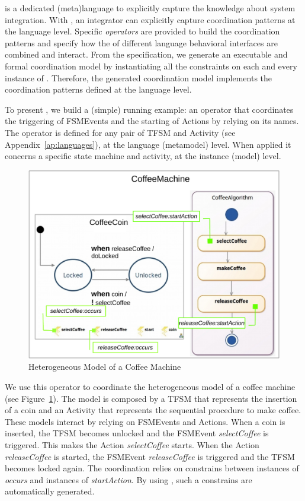 
\bcool is a dedicated (meta)language to explicitly capture the knowledge about system integration. With \bcool, an integrator can explicitly capture coordination patterns at the language level. Specific \emph{operators} are provided to build the coordination patterns and specify how the \dse of different language behavioral interfaces are combined and interact. From the \bcool specification, we generate an executable and formal coordination model by instantiating all the constraints on each and every instance of \dse. Therefore, the generated coordination model implements the coordination patterns defined at the language level.  

To present \bcool, we build a (simple) running example: an operator that coordinates the triggering of FSMEvents and the starting of Actions by relying on its names. The operator is defined for any pair of TFSM and Activity (see Appendix~\ref{ap:languages}), at the language (metamodel) level. When applied it concerns a specific state machine and activity, at the instance (model) level. 

\begin{figure}
	\center
	\includegraphics[width=.5\columnwidth]{bcool/figs/models.pdf}
	\caption{Heterogeneous Model of a Coffee Machine}
	\label{fig:runningexample}
\end{figure}

We use this operator to coordinate the heterogeneous model of a coffee machine (see Figure~\ref{fig:runningexample}). The model is composed by a TFSM that represents the insertion of a coin and an Activity that represents the sequential procedure to make coffee. These models interact by relying on FSMEvents and Actions. When a coin is inserted, the TFSM becomes unlocked and the FSMEvent \emph{selectCoffee} is triggered. This makes the Action \emph{selectCoffee} starts. When the Action \emph{releaseCoffee} is started, the FSMEvent \emph{releaseCoffee} is triggered and the TFSM becomes locked again. The coordination relies on constrains between instances of \dse \emph{occurs} and instances of \dse \emph{startAction}. By using \bcool, such a constrains are automatically generated.  
